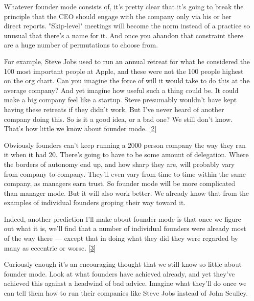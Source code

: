Whatever founder mode consists of, it's pretty
                  clear that it's going to break the principle that the CEO
                  should engage with the company only via his or her direct
                  reports. "Skip-level" meetings will become the norm instead of
                  a practice so unusual that there's a name for it. And once you
                  abandon that constraint there are a huge number of
                  permutations to choose from.

For example, Steve
                  Jobs used to run an annual retreat for what he considered the
                  100 most important people at Apple, and these were not the 100
                  people highest on the org chart. Can you imagine the force of
                  will it would take to do this at the average company? And yet
                  imagine how useful such a thing could be. It could make a big
                  company feel like a startup. Steve presumably wouldn't have
                  kept having these retreats if they didn't work. But I've never
                  heard of another company doing this. So is it a good idea, or
                  a bad one? We still don't know. That's how little we know
                  about founder mode.
                  [\href{\#f2n}{2}]

Obviously founders can't keep running a 2000
                  person company the way they ran it when it had 20. There's
                  going to have to be some amount of delegation. Where the
                  borders of autonomy end up, and how sharp they are, will
                  probably vary from company to company. They'll even vary from
                  time to time within the same company, as managers earn trust.
                  So founder mode will be more complicated than manager mode.
                  But it will also work better. We already know that from the
                  examples of individual founders groping their way toward
                  it.

Indeed, another prediction I'll make about
                  founder mode is that once we figure out what it is, we'll find
                  that a number of individual founders were already most of the
                  way there --- except that in doing what they did they were
                  regarded by many as eccentric or worse.
                  [\href{\#f3n}{3}]

Curiously enough it's an encouraging thought that
                  we still know so little about founder mode. Look at what
                  founders have achieved already, and yet they've achieved this
                  against a headwind of bad advice. Imagine what they'll do once
                  we can tell them how to run their companies like Steve Jobs
                  instead of John Sculley.









